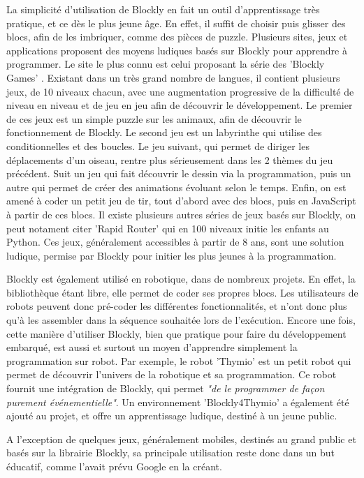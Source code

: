 \documentclass[12pt,francais]{report}
\begin{document}
La simplicité d'utilisation de Blockly en fait un outil d'apprentissage très pratique, et ce dès le plus jeune âge. En effet, il suffit de choisir puis glisser des blocs, afin de les imbriquer, comme des pièces de puzzle. Plusieurs sites, jeux et applications proposent des moyens ludiques basés sur Blockly pour apprendre à programmer. Le site le plus connu est celui proposant la série des 'Blockly Games' \cite{ref12}. Existant dans un très grand nombre de langues, il contient plusieurs jeux, de 10 niveaux chacun, avec une augmentation progressive de la difficulté de niveau en niveau et de jeu en jeu afin de découvrir le développement. Le premier de ces jeux est un simple puzzle sur les animaux, afin de découvrir le fonctionnement de Blockly. Le second jeu est un labyrinthe qui utilise des conditionnelles et des boucles. Le jeu suivant, qui permet de diriger les déplacements d'un oiseau, rentre plus sérieusement dans les 2 thèmes du jeu précédent. Suit un jeu qui fait découvrir le dessin via la programmation, puis un autre qui permet de créer des animations évoluant selon le temps. Enfin, on est amené à coder un petit jeu de tir, tout d'abord avec des blocs, puis en JavaScript à partir de ces blocs. Il existe plusieurs autres séries de jeux basés sur Blockly, on peut notament citer 'Rapid Router' \cite{ref13} qui en 100 niveaux initie les enfants au Python. Ces jeux, généralement accessibles à partir de 8 ans, sont une solution ludique, permise par Blockly pour initier les plus jeunes à la programmation.

Blockly est également utilisé en robotique, dans de nombreux projets. En effet, la bibliothèque étant libre, elle permet de coder ses propres blocs. Les utilisateurs de robots peuvent donc pré-coder les différentes fonctionnalités, et n'ont donc plus qu'à les assembler dans la séquence souhaitée lors de l'exécution. Encore une fois, cette manière d'utiliser Blockly, bien que pratique pour faire du développement embarqué, est aussi et surtout un moyen d'apprendre simplement la programmation sur robot. Par exemple, le robot 'Thymio' \cite{ref14} est un petit robot qui permet de découvrir l'univers de la robotique et sa programmation. Ce robot fournit une intégration de Blockly, qui permet \textit{"de le programmer de façon purement événementielle"}. Un environnement 'Blockly4Thymio' \cite{ref15} a également été ajouté au projet, et offre un apprentissage ludique, destiné à un jeune public.

A l'exception de quelques jeux, généralement mobiles, destinés au grand public et basés sur la librairie Blockly, sa principale utilisation reste donc dans un but éducatif, comme l'avait prévu Google en la créant.
\end{document}
